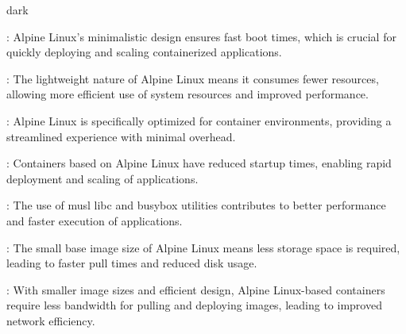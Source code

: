 \label{Performance and Speed}
\begin{baseBoxThree}{}{dark}
    \begin{posnexItemize}
        \item[\sA] : Alpine Linux's minimalistic design ensures fast boot times, which is crucial for quickly deploying and scaling containerized applications.
        \item[\sA] : The lightweight nature of Alpine Linux means it consumes fewer resources, allowing more efficient use of system resources and improved performance.
        \item[\sA] : Alpine Linux is specifically optimized for container environments, providing a streamlined experience with minimal overhead.
        \item[\sA] : Containers based on Alpine Linux have reduced startup times, enabling rapid deployment and scaling of applications.
        \item[\sA] : The use of musl libc and busybox utilities contributes to better performance and faster execution of applications.
        \item[\sA] : The small base image size of Alpine Linux means less storage space is required, leading to faster pull times and reduced disk usage.
        \item[\sA] : With smaller image sizes and efficient design, Alpine Linux-based containers require less bandwidth for pulling and deploying images, leading to improved network efficiency.
    \end{posnexItemize}
\end{baseBoxThree}

